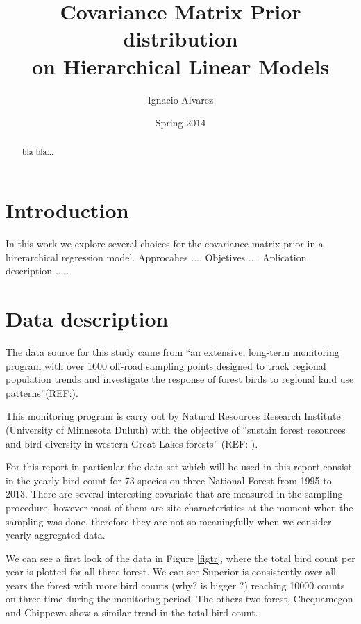 \documentclass{article}
\title{ Covariance Matrix Prior distribution \\ on Hierarchical Linear Models }
\author{Ignacio Alvarez}
\date{ Spring 2014 }
\begin{document}
\maketitle 
\thispagestyle{empty}

\begin{abstract}
bla bla...
\end{abstract}

\newpage 

\tableofcontents
\thispagestyle{empty}

\newpage 

\section{Introduction} 

In this work we explore several choices for the covariance matrix prior in a hirerarchical regression model. 
Approcahes .... 
Objetives ....
Aplication description .....

\section{Data description}
The data source for this study came from ``an extensive, long-term monitoring program with over 1600 off-road sampling points designed to track regional population trends and investigate the response of forest birds to regional land use patterns''(REF:). 

This monitoring program is carry out by Natural Resources Research Institute (University of Minnesota Duluth) with the objective of ``sustain forest resources and bird diversity in western Great Lakes forests'' (REF: ). 

For this report in particular the data set which will be used in this report consist in the yearly bird count for 73 species on three National Forest from 1995 to 2013. There are several interesting covariate that are measured in the sampling procedure, however most of them are site characteristics at the moment when the sampling was done, therefore they are not so meaningfully when we consider yearly aggregated data.  

We can see a first look of the data in Figure \ref{figtr}, where the total bird count per year is plotted for all three forest. We can see Superior is consistently over all years the forest with more bird counts (why? is bigger ?) reaching 10000 counts on three time during the monitoring period. The others two forest, Chequamegon and Chippewa show a similar trend in the total bird count. 
\end{document}
